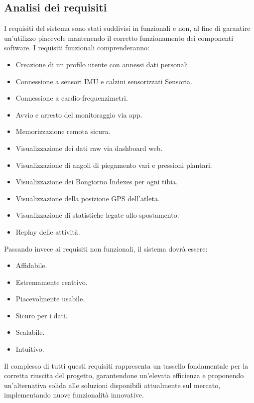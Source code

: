 \documentclass[target=bach,aauheader=,style=]{thud}
\begin{document}
\subsection{Analisi dei requisiti}
I requisiti del sistema sono stati suddivisi in funzionali e non, al fine di garantire un'utilizzo piacevole mantenendo il corretto funzionamento dei componenti software. I requisiti funzionali comprenderanno:

\begin{itemize}
    \item Creazione di un profilo utente con annessi dati personali.
    \item Connessione a sensori IMU e calzini sensorizzati Sensoria.
    \item Connessione a cardio-frequenzimetri.
    \item Avvio e arresto del monitoraggio via app.
    \item Memorizzazione remota sicura.
    \item Visualizzazione dei dati raw via dashboard web.
    \item Visualizzazione di angoli di piegamento vari e pressioni plantari.
    \item Visualizzazione dei Bongiorno Indexes per ogni tibia.
    \item Visualizzazione della posizione GPS dell'atleta.
    \item Visualizzazione di statistiche legate allo spostamento.
    \item Replay delle attività.
\end{itemize}
Passando invece ai requisiti non funzionali, il sistema dovrà essere:

\begin{itemize}
    \item Affidabile.
    \item Estremamente reattivo.
    \item Piacevolmente usabile.
    \item Sicuro per i dati.
    \item Scalabile.
    \item Intuitivo.
\end{itemize}
Il complesso di tutti questi requisiti rappresenta un tassello fondamentale per la corretta riuscita del progetto, garantendone un'elevata efficienza e proponendo un'alternativa solida alle soluzioni disponibili attualmente sul mercato, implementando nuove funzionalità innovative.
\end{document}
